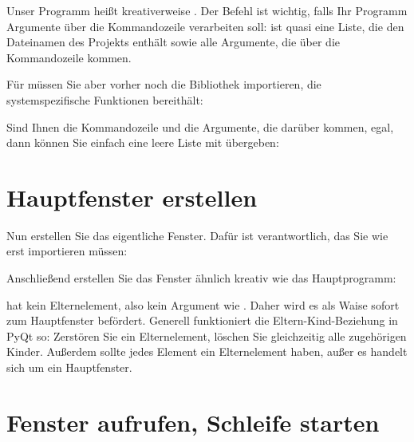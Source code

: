 \medskip


\medskip

Unser Programm heißt kreativerweise . Der Befehl  ist wichtig, falls Ihr Programm Argumente über die Kommandozeile verarbeiten soll:  ist quasi eine Liste, die den Dateinamen des Projekts enthält sowie alle Argumente, die über die Kommandozeile kommen.
    
Für  müssen Sie aber vorher noch die Bibliothek  importieren, die systemspezifische Funktionen bereithält:
    
\medskip


\medskip

Sind Ihnen die Kommandozeile und die Argumente, die darüber kommen, egal, dann können Sie  einfach eine leere Liste mit \PYTHON{[]} übergeben:
    
\medskip


\section{Hauptfenster erstellen}

Nun erstellen Sie das eigentliche Fenster. Dafür ist  verantwortlich, das Sie wie  erst importieren müssen:
    
\medskip


\medskip

Anschließend erstellen Sie das Fenster ähnlich kreativ wie das Hauptprogramm:
    
\medskip


\medskip

 hat kein Elternelement, also kein Argument wie . Daher wird es als Waise sofort zum Hauptfenster befördert. Generell funktioniert die Eltern-Kind-Beziehung in PyQt so: Zerstören Sie ein Elternelement, löschen Sie gleichzeitig alle zugehörigen Kinder. Außerdem sollte jedes Element ein Elternelement haben, außer es handelt sich um ein Hauptfenster.
    
\section{Fenster aufrufen, Schleife starten}

